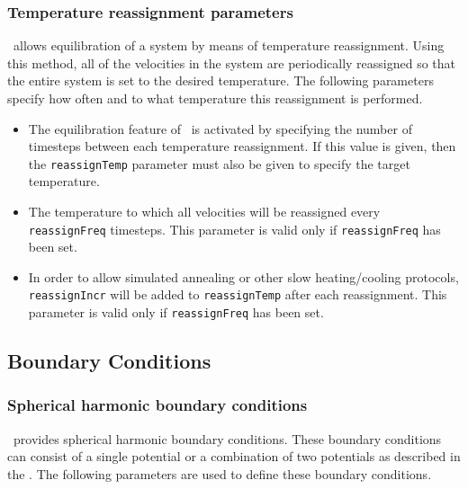 \subsubsection{Temperature reassignment parameters}

\NAMD\ allows equilibration of a system by means of temperature 
reassignment.  Using this method, all of the velocities in the system 
are periodically reassigned so that the entire system is set to the 
desired temperature.  The following parameters specify how often 
and to what temperature this reassignment is performed.  

\begin{itemize}

\item
{}
{The equilibration feature of \NAMD\ is activated by 
specifying the number of timesteps between each temperature reassignment.  
If this value is given, then the \verb!reassignTemp! parameter must also 
be given to specify the target temperature. }

\item
{}
{The temperature to which all velocities will be reassigned
every \verb!reassignFreq! timesteps.  
This parameter is valid only if \verb!reassignFreq! has been set.}

\item
{}
{In order to allow simulated annealing or other slow heating/cooling protocols, \verb!reassignIncr! will be added to \verb!reassignTemp! after each reassignment.
This parameter is valid only if \verb!reassignFreq! has been set.}

\end{itemize}

\subsection{Boundary Conditions}

\subsubsection{Spherical harmonic boundary conditions}

\NAMD\ provides spherical harmonic boundary conditions.  These 
boundary conditions can consist of a single potential or a 
combination of two potentials as described in the \PG.  
The following parameters are used to define these boundary conditions.  

